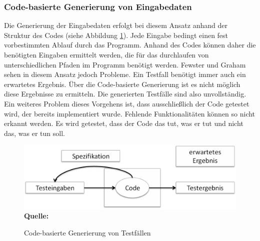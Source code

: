 \subsubsection{Code-basierte Generierung von Eingabedaten}
\label{subsubsec:codebasierte_generierung}
Die Generierung der Eingabedaten erfolgt bei diesem Ansatz anhand der Struktur des Codes (siehe Abbildung \ref{fig:codeBasedDesign}). Jede Eingabe bedingt einen fest vorbestimmten Ablauf durch das Programm. Anhand des Codes können daher die benötigten Eingaben ermittelt werden, die für das durchlaufen von unterschiedlichen Pfaden im Programm benötigt werden.
Fewster und Graham \cite[vgl. S. 19 ff.]{fewster_software_1999} sehen in diesem Ansatz jedoch Probleme. Ein Testfall benötigt immer auch ein erwartetes Ergebnis. Über die Code-basierte Generierung ist es nicht möglich diese Ergebnisse zu ermitteln. Die generierten Testfälle sind also unvollständig.\\
Ein weiteres Problem dieses Vorgehens ist, dass ausschließlich der Code getestet wird, der bereits implementiert wurde. Fehlende Funktionalitäten können so nicht erkannt werden. Es wird getestet, dass der Code das \grq tut, was er tut und nicht das, was er tun soll.\grq\ \cite[vgl. S. 20]{fewster_software_1999}
\begin{figure}[htb]
  \centering  
  \includegraphics[scale=0.6]{img/codeBasedDesign.png}\\
  \footnotesize\sffamily\textbf{Quelle:} \cite[vgl. S. 19]{fewster_software_1999}
  \caption{Code-basierte Generierung von Testfällen}
  \label{fig:codeBasedDesign}
\end{figure}


